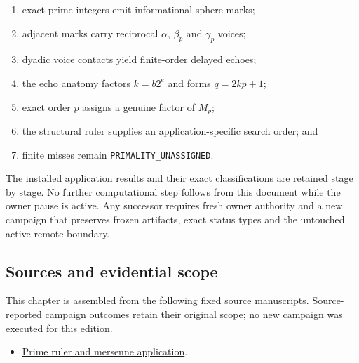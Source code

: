 \begin{enumerate}
\def\labelenumi{\arabic{enumi}.}
\tightlist
\item
  exact prime integers emit informational sphere marks;
\item
  adjacent marks carry reciprocal \(\alpha\), \(\beta_p\) and
  \(\gamma_p\) voices;
\item
  dyadic voice contacts yield finite-order delayed echoes;
\item
  the echo anatomy factors \(k=b2^e\) and forms \(q=2kp+1\);
\item
  exact order \(p\) assigns a genuine factor of \(M_p\);
\item
  the structural ruler supplies an application-specific search order;
  and
\item
  finite misses remain \texttt{PRIMALITY\_UNASSIGNED}.
\end{enumerate}

The installed application results and their exact classifications are
retained stage by stage. No further computational step follows from this
document while the owner pause is active. Any successor requires fresh
owner authority and a new campaign that preserves frozen artifacts,
exact status types and the untouched active-remote boundary.

\subsection{Sources and evidential
scope}\label{viii-ch10-sources-and-evidential-scope}

This chapter is assembled from the following fixed source manuscripts.
Source-reported campaign outcomes retain their original scope; no new
campaign was executed for this edition.

\begin{itemize}
\tightlist
\item
  \href{https://github.com/iwtbotiwtwot/SAMA/blob/4c2b5dc1649da5900c90b90d0ce56c223dbb7717/vol_iii/05-primes-and-jacobians/prime-ruler-and-mersenne-application.md}{Prime
  ruler and mersenne application}.
\end{itemize}
